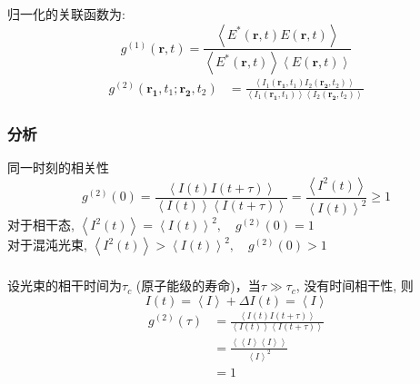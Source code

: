 \begin{frame}
\frametitle{}
归一化的关联函数为:
\[  g^{(1)} (\mathbf{r},t) =  \frac{\left\langle E^* (\mathbf{r},t) E (\mathbf{r},t)\right\rangle} {\left\langle E^* (\mathbf{r},t)\right\rangle\left\langle E (\mathbf{r},t)\right\rangle}  \]
\[ \begin{aligned}   
    g^{(2)} (\mathbf{r_1},t_1; \mathbf{r_2},t_2)  
    &= \frac{\left\langle I_1 (\mathbf{r_1},t_1) I_2 (\mathbf{r_2},t_2)\right\rangle}{\left\langle I_1 (\mathbf{r_1},t_1)\right\rangle\left\langle I_2 (\mathbf{r_2},t_2)\right\rangle}
   \end{aligned} \]
\end{frame}

 \begin{frame} 
  \frametitle{分析}
  同一时刻的相关性
  \[  g^{(2)}(0) = \frac{\left\langle I (t)  I (t+ \tau)\right\rangle} {\left\langle I (t) \right\rangle \left\langle I (t+ \tau)\right\rangle} =  \frac{\left\langle I^2 (t)  \right\rangle}{\left\langle I (t)\right\rangle^2 }  \geq 1\]
  对于相干态, $  \left\langle I^2 (t)  \right\rangle = \left\langle I (t) \right\rangle^2, \quad g^{(2)}(0) =1 $ \\ 
  对于混沌光束, $ \left\langle I^2 (t)  \right\rangle > \left\langle I(t) \right\rangle^2, \quad g^{(2)}(0) >1 $
\end{frame}

\begin{frame} 
      \frametitle{}   
  设光束的相干时间为$\tau_c$ (原子能级的寿命)，当$\tau\gg \tau_c$, 没有时间相干性, 则 
  \[ I (t) = \left\langle I \right\rangle  + \Delta I (t) =  \left\langle I  \right\rangle  \] 
  \[ \begin{aligned}
    g^{(2)}(\tau) &= \frac{\left\langle I (t)  I (t+ \tau)\right\rangle }{\left\langle I (t) \right\rangle \left\langle  I (t+ \tau)\right\rangle }\\ 
    &= \frac{\left\langle \left\langle I  \right\rangle  \left\langle I  \right\rangle \right\rangle}{\left\langle I \right\rangle^2} \\
    &= 1 
\end{aligned}\]     
\end{frame}
  
